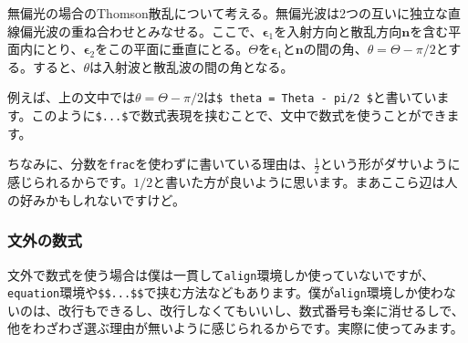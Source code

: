 \documentclass[a4paper,papersize,uplatex,dvipdfmx,10pt]{jsarticle}
\newcommand{\bs}{\symbol{92}} %
\begin{document}
\begin{screen}
  無偏光の場合のThomson散乱について考える。無偏光波は2つの互いに独立な直線偏光波の重ね合わせとみなせる。ここで、$\bm{\epsilon}_{1}$を入射方向と散乱方向$\bm{n}$を含む平面内にとり、$\bm{\epsilon}_{2}$をこの平面に垂直にとる。$\Theta$を$\bm{\epsilon}_{1}$と$\bm{n}$の間の角、$\theta = \Theta - \pi/2$とする。すると、$\theta$は入射波と散乱波の間の角となる。
\end{screen}

例えば、上の文中では$\theta = \Theta - \pi/2$は\texttt{\$ \bs theta = \bs Theta - \bs pi/2 \$}と書いています。このように\texttt{\$...\$}で数式表現を挟むことで、文中で数式を使うことができます。\par
ちなみに、分数を\texttt{\bs frac}を使わずに書いている理由は、$\frac{1}{2}$という形がダサいように感じられるからです。$1/2$と書いた方が良いように思います。まあここら辺は人の好みかもしれないですけど。

\subsubsection{文外の数式} %
文外で数式を使う場合は僕は一貫して\texttt{align}環境しか使っていないですが、\texttt{equation}環境や\texttt{\$\$...\$\$}で挟む方法などもあります。僕が\texttt{align}環境しか使わないのは、改行もできるし、改行しなくてもいいし、数式番号も楽に消せるしで、他をわざわざ選ぶ理由が無いように感じられるからです。実際に使ってみます。
\end{document}
